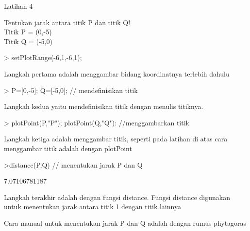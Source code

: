 \documentclass[a4paper,10pt]{article}
\begin{document}
\begin{eulernotebook}
\begin{eulercomment}
\begin{eulercomment}
\begin{eulercomment}
Latihan 4\\
\end{eulercomment}
\eulersubheading{}
\begin{eulercomment}
Tentukan jarak antara titik P dan titik Q!\\
Titik P = (0,-5)\\
Titik Q = (-5,0)
\end{eulercomment}
\begin{eulerprompt}
> setPlotRange(-6,1,-6,1);
\end{eulerprompt}
\begin{eulercomment}
Langkah pertama adalah menggambar bidang koordinatnya terlebih dahulu
\end{eulercomment}
\begin{eulerprompt}
> P=[0,-5]; Q=[-5,0]; // mendefinisikan titik
\end{eulerprompt}
\begin{eulercomment}
Langkah kedua yaitu mendefinisikan titik dengan menulis titiknya.
\end{eulercomment}
\begin{eulerprompt}
> plotPoint(P,"P"); plotPoint(Q,"Q"): //menggambarkan titik
\end{eulerprompt}
\begin{eulercomment}
Langkah ketiga adalah menggambar titik, seperti pada latihan di atas
cara menggambar titik adalah dengan plotPoint
\end{eulercomment}
\begin{eulerprompt}
>distance(P,Q) // menentukan jarak P dan Q
\end{eulerprompt}
\begin{euleroutput}
  7.07106781187
\end{euleroutput}
\begin{eulercomment}
Langkah terakhir adalah dengan fungsi distance. Fungsi distance
digunakan untuk menentukan jarak antara titik 1 dengan titik lainnya

Cara manual untuk menentukan jarak P dan Q adalah dengan rumus
phytagoras


\end{eulercomment}
\end{eulercomment}
\end{eulercomment}
\end{eulernotebook}
\end{document}
